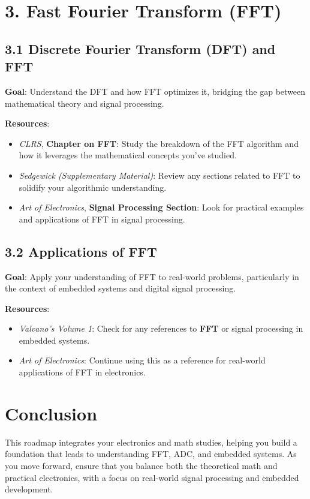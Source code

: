 \documentclass{article}
\begin{document}
\section*{3. Fast Fourier Transform (FFT)}

\subsection*{3.1 Discrete Fourier Transform (DFT) and FFT}
\textbf{Goal}: Understand the DFT and how FFT optimizes it, bridging the gap between mathematical theory and signal processing.

\textbf{Resources}:
\begin{itemize}
    \item \textit{CLRS}, \textbf{Chapter on FFT}: Study the breakdown of the FFT algorithm and how it leverages the mathematical concepts you've studied.
    \item \textit{Sedgewick (Supplementary Material)}: Review any sections related to FFT to solidify your algorithmic understanding.
    \item \textit{Art of Electronics}, \textbf{Signal Processing Section}: Look for practical examples and applications of FFT in signal processing.
\end{itemize}

\subsection*{3.2 Applications of FFT}
\textbf{Goal}: Apply your understanding of FFT to real-world problems, particularly in the context of embedded systems and digital signal processing.

\textbf{Resources}:
\begin{itemize}
    \item \textit{Valvano’s Volume 1}: Check for any references to \textbf{FFT} or signal processing in embedded systems.
    \item \textit{Art of Electronics}: Continue using this as a reference for real-world applications of FFT in electronics.
\end{itemize}

\section*{Conclusion}
This roadmap integrates your electronics and math studies, helping you build a foundation that leads to understanding FFT, ADC, and embedded systems. As you move forward, ensure that you balance both the theoretical math and practical electronics, with a focus on real-world signal processing and embedded development.
\end{document}
